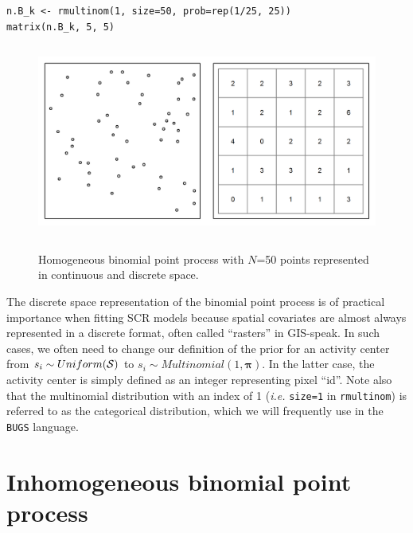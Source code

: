 \begin{verbatim}
n.B_k <- rmultinom(1, size=50, prob=rep(1/25, 25))
matrix(n.B_k, 5, 5)
\end{verbatim}


\begin{figure}
\centering
\includegraphics[width=5in,height=2.5in]{Ch11/figs/homoPlots}
\label{ch9.fig.homo}
\caption{Homogeneous binomial point process with $N$=50 points
  represented in continuous and discrete space.}
\end{figure}


The discrete space representation of the binomial point process is of
practical importance when fitting SCR models because spatial covariates
are almost always represented in a discrete format, often called
``rasters'' in GIS-speak. In such cases, we often need to change our
definition of the prior for an activity center from $s_i \sim
Uniform(\cal{S})$ to $s_i \sim Multinomial(1, \mathbf{\pi})$. In the
latter case, the activity center is simply defined as an integer
representing pixel ``id''. Note also that the multinomial distribution
with an index of 1 (\emph{i.e.} \verb+size=1+ in \verb+rmultinom+)
is referred to as the categorical distribution,
which we will frequently use in the \verb+BUGS+ language.



\section{Inhomogeneous binomial point process}


